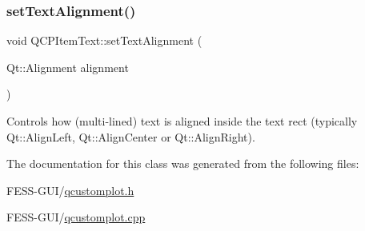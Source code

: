 \subsubsection{\texorpdfstring{set\+Text\+Alignment()}{setTextAlignment()}}
{\footnotesize\ttfamily void Q\+C\+P\+Item\+Text\+::set\+Text\+Alignment (\begin{DoxyParamCaption}\item[{Qt\+::\+Alignment}]{alignment }\end{DoxyParamCaption})}

Controls how (multi-\/lined) text is aligned inside the text rect (typically Qt\+::\+Align\+Left, Qt\+::\+Align\+Center or Qt\+::\+Align\+Right). 

The documentation for this class was generated from the following files\+:\begin{DoxyCompactItemize}
\item 
F\+E\+S\+S-\/\+G\+U\+I/\hyperlink{qcustomplot_8h}{qcustomplot.\+h}\item 
F\+E\+S\+S-\/\+G\+U\+I/\hyperlink{qcustomplot_8cpp}{qcustomplot.\+cpp}\end{DoxyCompactItemize}
